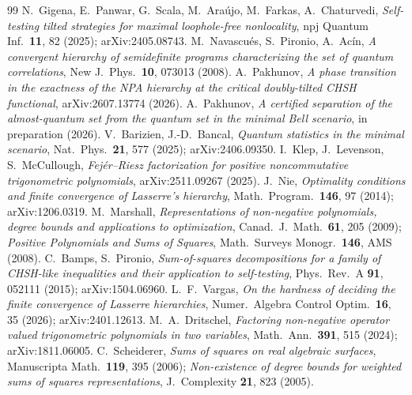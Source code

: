 \documentclass[11pt]{article}
\begin{document}
\begin{thebibliography}{99}
 N.~Gigena, E.~Panwar, G.~Scala, M.~Ara\'ujo, M.~Farkas,
A.~Chaturvedi, \emph{Self-testing tilted strategies for maximal
loophole-free nonlocality}, npj Quantum Inf.\ \textbf{11}, 82 (2025);
arXiv:2405.08743.
 M.~Navascu\'es, S.~Pironio, A.~Ac\'in, \emph{A convergent
hierarchy of semidefinite programs characterizing the set of quantum
correlations}, New J.\ Phys.\ \textbf{10}, 073013 (2008).
 A.~Pakhunov, \emph{A phase transition in the exactness
of the NPA hierarchy at the critical doubly-tilted CHSH functional},
arXiv:2607.13774 (2026).
 A.~Pakhunov, \emph{A certified separation of the
almost-quantum set from the quantum set in the minimal Bell scenario},
in preparation (2026).
 V.~Barizien, J.-D.~Bancal, \emph{Quantum statistics in the
minimal scenario}, Nat.\ Phys.\ \textbf{21}, 577 (2025); arXiv:2406.09350.
 I.~Klep, J.~Levenson, S.~McCullough, \emph{Fej\'er--Riesz
factorization for positive noncommutative trigonometric polynomials},
arXiv:2511.09267 (2025).
 J.~Nie, \emph{Optimality conditions and finite convergence
of Lasserre's hierarchy}, Math.\ Program.\ \textbf{146}, 97 (2014);
arXiv:1206.0319.
 M.~Marshall, \emph{Representations of non-negative
polynomials, degree bounds and applications to optimization}, Canad.\ J.\
Math.\ \textbf{61}, 205 (2009); \emph{Positive Polynomials and Sums of
Squares}, Math.\ Surveys Monogr.\ \textbf{146}, AMS (2008).
 C.~Bamps, S.~Pironio, \emph{Sum-of-squares
decompositions for a family of CHSH-like inequalities and their
application to self-testing}, Phys.\ Rev.\ A \textbf{91}, 052111 (2015);
arXiv:1504.06960.
 L.~F.~Vargas, \emph{On the hardness of deciding the
finite convergence of Lasserre hierarchies}, Numer.\ Algebra Control
Optim.\ \textbf{16}, 35 (2026); arXiv:2401.12613.
 M.~A.~Dritschel, \emph{Factoring non-negative operator
valued trigonometric polynomials in two variables}, Math.\ Ann.\
\textbf{391}, 515 (2024); arXiv:1811.06005.
\bibitem{Scheiderer} C.~Scheiderer, \emph{Sums of squares on real
algebraic surfaces}, Manuscripta Math.\ \textbf{119}, 395 (2006);
\emph{Non-existence of degree bounds for weighted sums of squares
representations}, J.\ Complexity \textbf{21}, 823 (2005).
\end{thebibliography}
\end{document}
